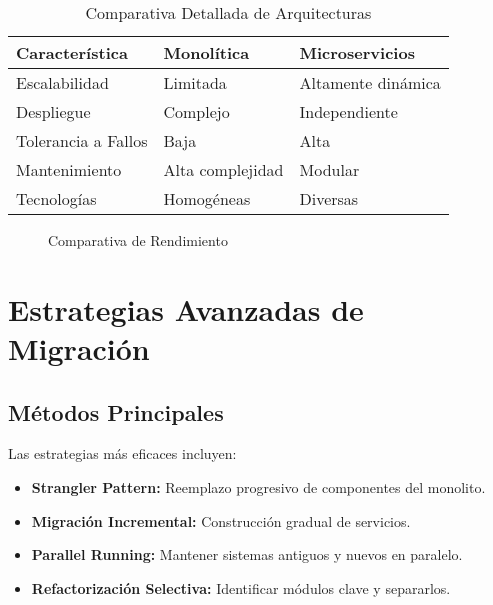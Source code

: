 \documentclass[conference]{IEEEtran}
\begin{document}
\begin{table}[htbp]
\caption{Comparativa Detallada de Arquitecturas}
\label{tab:architecture_comparison}
\begin{tabular}{|p{2.5cm}|p{2.5cm}|p{2.5cm}|}
\hline
\textbf{Característica} & \textbf{Monolítica} & \textbf{Microservicios} \\
\hline
Escalabilidad & Limitada & Altamente dinámica \\
Despliegue & Complejo & Independiente \\
Tolerancia a Fallos & Baja & Alta \\
Mantenimiento & Alta complejidad & Modular \\
Tecnologías & Homogéneas & Diversas \\
\hline
\end{tabular}
\end{table}

\begin{figure}[htbp]
\centering
{}
\caption{Comparativa de Rendimiento}
\label{fig:comparison_chart}
\end{figure}

\section{Estrategias Avanzadas de Migración}

\subsection{Métodos Principales}
Las estrategias más eficaces incluyen:

\begin{itemize}
    \item \textbf{Strangler Pattern:} Reemplazo progresivo de componentes del monolito.
    \item \textbf{Migración Incremental:} Construcción gradual de servicios.
    \item \textbf{Parallel Running:} Mantener sistemas antiguos y nuevos en paralelo.
    \item \textbf{Refactorización Selectiva:} Identificar módulos clave y separarlos.
\end{itemize}
\end{document}
